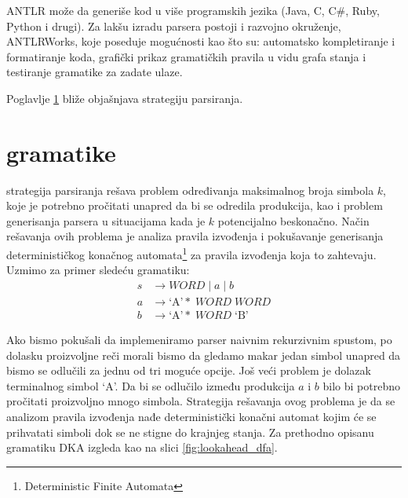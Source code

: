  
ANTLR može da generiše kod u više programskih jezika (Java, C, C\#, Ruby, Python i drugi). 
Za lakšu izradu parsera postoji i razvojno okruženje, ANTLRWorks, koje poseduje mogućnosti kao što su: 
automatsko kompletiranje i formatiranje koda, grafički prikaz gramatičkih pravila u vidu grafa stanja i testiranje gramatike za zadate ulaze.

Poglavlje \ref{sec:lla-gram} bliže objašnjava \LLa strategiju parsiranja.

\section{\LLa gramatike}
\label{sec:lla-gram}

\LLa strategija parsiranja rešava problem određivanja maksimalnog broja simbola $k$, koje je potrebno pročitati unapred da bi se odredila produkcija, kao i problem generisanja parsera u situacijama kada je $k$ potencijalno beskonačno.
Način rešavanja ovih problema je analiza pravila izvođenja i pokušavanje generisanja determinističkog konačnog automata\footnote{\eng Deterministic Finite Automata} za pravila izvođenja koja to zahtevaju.
Uzmimo za primer sledeću gramatiku:
\begin{align*}
    s &\rightarrow WORD \; | \; a \; | \; b \\
    a &\rightarrow \text{`A'}\ast \; WORD \; WORD \\
    b &\rightarrow \text{`A'}\ast \; WORD \; \text{`B'}
\end{align*}

Ako bismo pokušali da implemeniramo parser naivnim rekurzivnim spustom, po dolasku proizvoljne reči morali bismo da gledamo makar jedan simbol unapred da bismo se odlučili za jednu od tri moguće opcije.
Još veći problem je dolazak terminalnog simbol `A'. Da bi se odlučilo između produkcija $a$ i $b$ bilo bi potrebno pročitati proizvoljno mnogo simbola.
Strategija rešavanja ovog problema je da se analizom pravila izvođenja nađe deterministički konačni automat kojim će se prihvatati simboli dok se ne stigne do krajnjeg stanja.
Za prethodno opisanu gramatiku DKA izgleda kao na slici \ref{fig:lookahead_dfa}.

